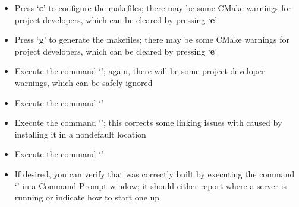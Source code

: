 \begin{itemize}
`\textbf{CREATE\fUS{}YMANAGER}' (or\\
`\textbf{CREATE\fUS{}YMANAGER\fUS{}CONSOLE}') and
`\textbf{YARP\fUS{}USE\fUS{}READLINE}' should be disabled
\item\exSp{}Press `\textbf{c}' to configure the makefiles; there may be some CMake
warnings for project developers, which can be cleared by pressing `\textbf{e}'
\item\exSp{}Press `\textbf{g}' to generate the makefiles; there may be some CMake
warnings for project developers, which can be cleared by pressing `\textbf{e}'
\item\exSp{}Execute the command `'; again, there will be some project
developer warnings, which can be safely ignored
\item\exSp{}Execute the command `'
\item\exSp{}Execute the command `'; this corrects some
linking issues with \yarp{} caused by installing it in a non\longDash{}default location
\item\exSp{}Execute the command `'
\item\exSp{}If desired, you can verify that \yarp{} was correctly built by executing the
command `' in a Command Prompt window; it should either report where a
\yarp{} server is running or indicate how to start one up
\end{itemize}
\tertiaryEnd
{}
